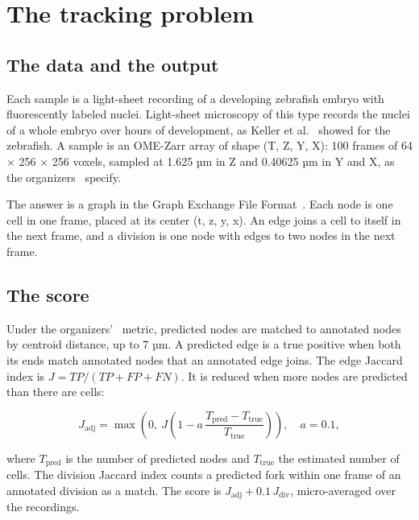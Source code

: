 \chapter{\texorpdfstring{The tracking problem}{The tracking problem}}
\label{chap:tracking-problem}

\section{\texorpdfstring{The data and the output}{The data and the output}}

Each sample is a light-sheet recording of a developing zebrafish embryo with fluorescently labeled nuclei. Light-sheet microscopy of this type records the nuclei of a whole embryo over hours of development, as Keller et al.~\cite{src:Keller-2008} showed for the zebrafish. A sample is an OME-Zarr array of shape (T, Z, Y, X): 100 frames of 64 × 256 × 256 voxels, sampled at 1.625 µm in Z and 0.40625 µm in Y and X, as the organizers~\cite{src:Biohub-competition} specify.

The answer is a graph in the Graph Exchange File Format~\cite{src:GEFF}. Each node is one cell in one frame, placed at its center (t, z, y, x). An edge joins a cell to itself in the next frame, and a division is one node with edges to two nodes in the next frame.

\section{\texorpdfstring{The score}{The score}}

Under the organizers'~\cite{src:Biohub-competition} metric, predicted nodes are matched to annotated nodes by centroid distance, up to 7 µm. A predicted edge is a true positive when both its ends match annotated nodes that an annotated edge joins. The edge Jaccard index is \(J = TP / (TP + FP + FN)\). It is reduced when more nodes are predicted than there are cells:

\[
J_{\mathrm{adj}} = \max\left(0,\ J\left(1 - a\,\frac{T_{\mathrm{pred}} - T_{\mathrm{true}}}{T_{\mathrm{true}}}\right)\right), \quad a = 0.1,
\]

where \(T_{\mathrm{pred}}\) is the number of predicted nodes and \(T_{\mathrm{true}}\) the estimated number of cells. The division Jaccard index counts a predicted fork within one frame of an annotated division as a match. The score is \(J_{\mathrm{adj}} + 0.1\,J_{\mathrm{div}}\), micro-averaged over the recordings.

